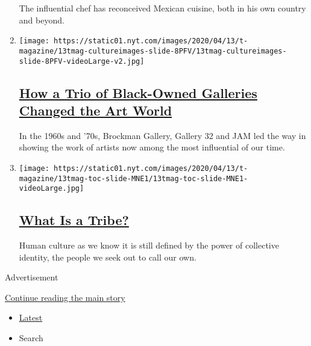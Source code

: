 \begin{enumerate}
  The influential chef has reconceived Mexican cuisine, both in his own
  country and beyond.
\item
  \texttt{[image: https://static01.nyt.com/images/2020/04/13/t-magazine/13tmag-cultureimages-slide-8PFV/13tmag-cultureimages-slide-8PFV-videoLarge-v2.jpg]}

  \hypertarget{how-a-trio-of-black-owned-galleries-changed-the-art-world}{%
  \subsection{\texorpdfstring{\href{/interactive/2020/04/13/t-magazine/black-art-galleries.html}{How
  a Trio of Black-Owned Galleries Changed the Art
  World}}{How a Trio of Black-Owned Galleries Changed the Art World}}\label{how-a-trio-of-black-owned-galleries-changed-the-art-world}}

  In the 1960s and '70s, Brockman Gallery, Gallery 32 and JAM led the
  way in showing the work of artists now among the most influential of
  our time.
\item
  \texttt{[image: https://static01.nyt.com/images/2020/04/13/t-magazine/13tmag-toc-slide-MNE1/13tmag-toc-slide-MNE1-videoLarge.jpg]}

  \hypertarget{what-is-a-tribe}{%
  \subsection{\texorpdfstring{\href{/interactive/2020/04/13/t-magazine/tribe-meaning.html}{What
  Is a Tribe?}}{What Is a Tribe?}}\label{what-is-a-tribe}}

  Human culture as we know it is still defined by the power of
  collective identity, the people we seek out to call our own.
\end{enumerate}

Advertisement

\protect\hyperlink{after-mid1}{Continue reading the main story}

\begin{itemize}
\tightlist
\item
  \protect\hyperlink{stream-panel}{Latest}
\item
  Search
\end{itemize}

